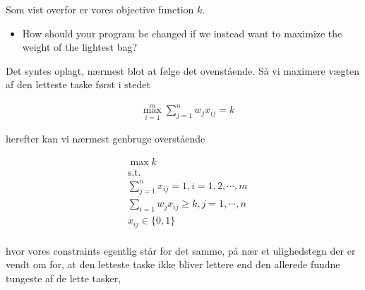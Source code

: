 \documentclass[paper=a4, fontsize=11pt]{scrartcl} %
\numberwithin{equation}{section} %
\numberwithin{figure}{section} %
\numberwithin{table}{section} %
\begin{document}
	Som vist overfor er vores objective function $k$.
	
	\begin{itemize}
		\item How  should  your  program  be  changed  if  we  instead  want  to  maximize  the  weight  of  the lightest bag?
	\end{itemize}
	
	Det syntes oplagt, nærmest blot at følge det ovenstående. Så vi maximere vægten af den letteste taske først i stedet
	
	\begin{align*}
	&\max_{i=1}^{m} \sum_{j=1}^{n} w_j x_{ij} = k
	\end{align*}
	
	herefter kan vi nærmest genbruge overstående
	
	\begin{align*}
	&\max k\\
	&\text{s.t.}\\
	&\sum_{j=1}^n x_{ij} = 1, i = 1,2,\cdots,m\\
	&\sum_{i=1} w_j x_{ij} \geq k, j = 1,\cdots,n \\
	&x_{ij} \in \{0,1\}\\
	\end{align*} 
	
	hvor vores constraints egentlig står for det samme, på nær et ulighedstegn der er vendt om for, at den letteste taske ikke bliver lettere end den allerede fundne tungeste af de lette tasker, 
	
	
\end{document}
